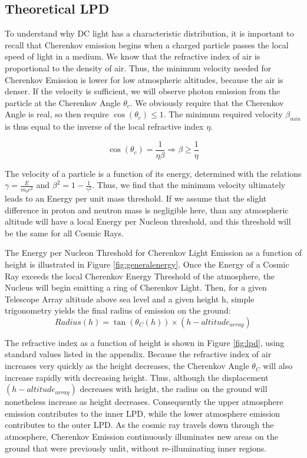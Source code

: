 \documentclass[11pt]{article}
\begin{document}
\subsection{Theoretical LPD}
To understand why DC light has a characteristic distribution, it is important to recall that Cherenkov emission begins when a charged particle passes the local speed of light in a medium.  We know that the refractive index of air is proportional to the density of air. Thus, the minimum velocity needed for Cherenkov Emission is lower for low atmospheric altitudes, because the air is denser. If the velocity is sufficient, we will observe photon emission from the particle at the Cherenkov Angle $\theta_{c}$. We obviously require that the Cherenkov Angle is real, so then require $\cos(\theta_{c}) \leq 1$. The minimum required velocity $\beta_{min}$ is thus equal to the inverse of the local refractive index $\eta$. 

\[ \cos(\theta_{c}) = \frac{1}{\eta \beta}  \Longrightarrow \beta \geq \frac{1}{\eta}\]

The velocity of a particle is a function of its energy, determined with the relations $\gamma = \frac{E}{m_{0} c^{2}}$ and $\beta^{2} = 1 - \frac{1}{\gamma ^{2}}$. Thus, we find that the minimum velocity ultimately leads to an Energy per unit mass threshold. If we assume that the slight difference in proton and neutron mass is negligible here, than any atmospheric altitude will have a local Energy per Nucleon threshold, and this threshold will be the same for all Cosmic Rays. 

The Energy per Nucleon Threshold for Cherenkov Light Emission as a function of height is illustrated in Figure \ref{fig:generalenergy}. Once the Energy of a Cosmic Ray exceeds the local Cherenkov Energy Threshold of the atmosphere, the Nucleus will begin emitting a ring of Cherenkov Light.  Then, for a given Telescope Array altitude above sea level and a given height h, simple trigonometry yields the final radius of emission on the ground:
\[ Radius(h) = \tan (\theta_{C}(h)) \times (h - altitude_{array})\]

The refractive index as a function of height is shown in Figure \ref{fig:lpd}, using standard values listed in the appendix. Because the refractive index of air increases very quickly as the height decreases, the Cherenkov Angle $\theta_{C}$ will also increase rapidly with decreasing height. Thus, although the displacement $(h - altitude_{array})$ decreases with height, the radius on the ground will nonetheless increase as height decreases. Consequently the upper atmosphere emission contributes to the inner LPD, while the lower atmosphere emission contributes to the outer LPD. As the cosmic ray travels down through the atmosphere, Cherenkov Emission continuously illuminates new areas on the ground that were previously unlit, without re-illuminating inner regions. 
\end{document}
